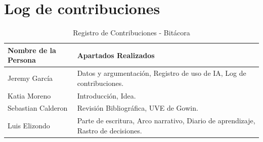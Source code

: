 \documentclass[12pt]{article}
\begin{document}
\section{Log de contribuciones}
\begin{table}[h]
    \centering
    \caption{Registro de Contribuciones - Bitácora}
    \vspace{2mm}
    \begin{tabularx}{\textwidth}{l X}
    \toprule
    \textbf{Nombre de la Persona} & \textbf{Apartados Realizados} \\ \midrule
    Jeremy García      & Datos y argumentación, Registro de uso de IA, Log de contribuciones. \\ \addlinespace
    Katia Moreno       & Introducción, Idea. \\ \addlinespace
    Sebastian Calderon & Revisión Bibliográfica, UVE de Gowin. \\ \addlinespace
    Luis Elizondo      & Parte de escritura, Arco narrativo, Diario de aprendizaje, Rastro de decisiones. \\ \bottomrule
    \end{tabularx}
\end{table}



\nocite{*}
\end{document}
